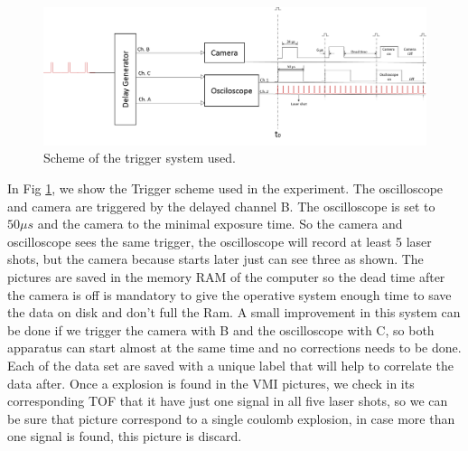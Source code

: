 \begin{figure}[hbtp]
\label{fig:triggers}
\centering
\includegraphics[width = 14 cm]{../Images/Trigger scheme.png}
\caption[Trigger Scheme]{Scheme of the trigger system used.  }
\end{figure}

In Fig \ref{fig:triggers}, we show the Trigger scheme used in the experiment. The oscilloscope and camera are triggered by the delayed channel B. The oscilloscope is set to $50\mu s$ and the camera to the minimal exposure time. So the camera and oscilloscope sees the same trigger, the oscilloscope will record at least 5 laser shots, but the camera because starts later just can see three as shown. The pictures are saved in the memory RAM of the computer so the dead time after the camera is off is mandatory to give the operative system enough time to save the data on disk and don't full the Ram. A small improvement in this system can be done if we trigger the camera with B and the oscilloscope with C, so both apparatus can start almost at the same time and no corrections needs to be done. Each of the data set are saved with a unique label that will help to correlate the data after. Once a explosion is found in the VMI pictures, we check in its corresponding TOF that it have just one signal in all five laser shots, so we can be sure that picture correspond to a single coulomb explosion, in case more than one signal is found, this picture is discard. 




